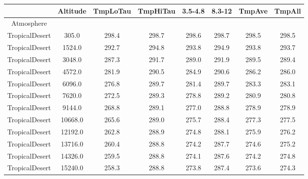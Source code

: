 \documentclass{workpackage}
\begin{document}
\begin{center}

\begin{normalsize}

\begin{tabular}{|c|c|c|c|c|c|c|c|}
\hline
&Altitude&TmpLoTau&TmpHiTau&3.5-4.8&8.3-12&TmpAve&TmpAll\\\hline
Atmosphere&&&&&&&\\\hline
TropicalDesert&305.0&298.4&298.7&298.6&298.7&298.5&298.5\\\hline
TropicalDesert&1524.0&292.7&294.8&293.8&294.9&293.8&293.7\\\hline
TropicalDesert&3048.0&287.3&291.7&289.0&291.9&289.5&289.4\\\hline
TropicalDesert&4572.0&281.9&290.5&284.9&290.6&286.2&286.0\\\hline
TropicalDesert&6096.0&276.8&289.7&281.4&289.7&283.3&283.1\\\hline
TropicalDesert&7620.0&272.5&289.3&278.8&289.2&280.9&280.8\\\hline
TropicalDesert&9144.0&268.8&289.1&277.0&288.8&278.9&278.9\\\hline
TropicalDesert&10668.0&265.6&289.0&275.7&288.4&277.3&277.5\\\hline
TropicalDesert&12192.0&262.8&288.9&274.8&288.1&275.9&276.2\\\hline
TropicalDesert&13716.0&260.4&288.8&274.2&287.7&274.6&275.2\\\hline
TropicalDesert&14326.0&259.5&288.8&274.1&287.6&274.2&274.8\\\hline
TropicalDesert&15240.0&258.3&288.8&273.8&287.4&273.6&274.3\\\hline

\end{tabular}
\end{normalsize}
\end{center}
\end{document}
